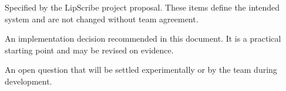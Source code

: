 \begin{description}[leftmargin=3.2cm,style=nextline]
  \item[\spec] Specified by the LipScribe project proposal. These items define
        the intended system and are not changed without team agreement.
  \item[\rec] An implementation decision recommended in this document. It is
        a practical starting point and may be revised on evidence.
  \item[\tbd] An open question that will be settled experimentally or by the
        team during development.
\end{description}
